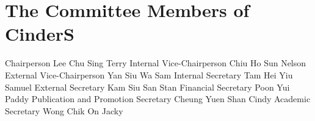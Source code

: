 \phantom{-}
\vfill

\section{The Committee Members of CinderS}

\startalignment[middle]
\dontleavehmode
\vbox{%
\starttabulate[|r|c|c|c|]
\HL
%
\NC {}
\NC {}
\NC {}
\NC {}
\fourperemspace\NC\NR
%
\HL
%
\NC Chairperson
\NC Lee Chu Sing
\NC Terry
\fourperemspace\NC\NR
%
\NC Internal Vice-Chairperson
\NC Chiu Ho Sun
\NC Nelson
\fourperemspace\NC\NR
%
\NC External Vice-Chairperson
\NC Yan Siu Wa
\NC Sam
\fourperemspace\NC\NR
%
\NC Internal Secretary
\NC Tam Hei Yiu
\NC Samuel
\fourperemspace\NC\NR
%
\NC External Secretary
\NC Kam Siu San
\NC Stan
\fourperemspace\NC\NR
%
\NC Financial Secretary
\NC Poon Yui
\NC Paddy
\fourperemspace\NC\NR
%
\NC \fourperemspace
Publication and Promotion Secretary
\NC Cheung Yuen Shan
\NC Cindy
\fourperemspace\NC\NR
%
\NC Academic Secretary
\NC Wong Chik On
\NC Jacky
\fourperemspace\NC\NR
%
\HL
\stoptabulate
}
\stopalignment

\vfill
\phantom{-}

\pagebreak
